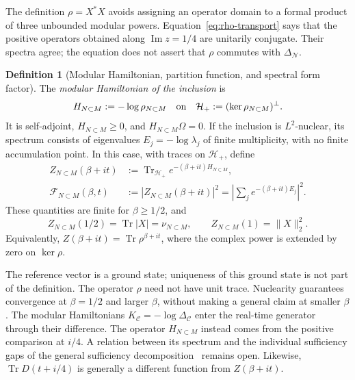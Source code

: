 \documentclass[a4paper,11pt]{article}
\theoremstyle{definition}
\newtheorem{definition}{Definition}[section]
\begin{document}
The definition $\rho=X^*X$ avoids assigning an operator domain to a formal product of three unbounded modular powers. Equation~\eqref{eq:rho-transport} says that the positive operators obtained along $\operatorname{Im}z=1/4$ are unitarily conjugate. Their spectra agree; the equation does not assert that $\rho$ commutes with $\Delta_{\mathcal N}$.

\begin{definition}[Modular Hamiltonian, partition function, and spectral form factor]\label{def:modular-SFF}
The \emph{modular Hamiltonian of the inclusion} is
\begin{equation}
 H_{N\subset M}:=-\log\rho_{N\subset M}
 \quad\hbox{on}\quad
 \mathcal H_+:=(\ker\rho_{N\subset M})^\perp.
 \label{eq:inclusion-H}
\end{equation}
It is self-adjoint, $H_{N\subset M}\ge0$, and $H_{N\subset M}\Omega=0$. If the inclusion is $L^2$-nuclear, its spectrum consists of eigenvalues $E_j=-\log\lambda_j$ of finite multiplicity, with no finite accumulation point. In this case, with traces on $\mathcal H_+$, define
\begin{align}
 Z_{N\subset M}(\beta+it)
   &:=\operatorname{Tr}_{\mathcal H_+}e^{-(\beta+it)H_{N\subset M}},\nonumber\\
 \mathcal F_{N\subset M}(\beta,t)
   &:=|Z_{N\subset M}(\beta+it)|^2
     =\left|\sum_j e^{-(\beta+it)E_j}\right|^2.
 \label{eq:modular-SFF}
\end{align}
These quantities are finite for $\beta\ge1/2$, and
\begin{equation}
 Z_{N\subset M}(1/2)=\operatorname{Tr}|X|=\nu_{N\subset M},
 \qquad Z_{N\subset M}(1)=\|X\|_2^2.
 \label{eq:Z-half}
\end{equation}
Equivalently, $Z(\beta+it)=\operatorname{Tr}\rho^{\beta+it}$, where the complex power is extended by zero on $\ker\rho$.
\end{definition}

The reference vector is a ground state; uniqueness of this ground state is not part of the definition. The operator $\rho$ need not have unit trace. Nuclearity guarantees convergence at $\beta=1/2$ and larger $\beta$, without making a general claim at smaller $\beta$. The modular Hamiltonians $K_{\mathcal C}=-\log\Delta_{\mathcal C}$ enter the real-time generator through their difference. The operator $H_{N\subset M}$ instead comes from the positive comparison at $i/4$. A relation between its spectrum and the individual sufficiency gaps of the general sufficiency decomposition~\cite{companionQEC} remains open. Likewise, $\operatorname{Tr}D(t+i/4)$ is generally a different function from $Z(\beta+it)$.
\end{document}

